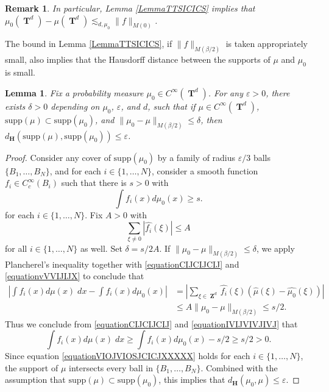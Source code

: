 \documentclass[dvipsnames,letterpaper,12pt]{article}
\numberwithin{equation}{section}
\DeclareMathOperator{\ZZ}{\mathbf{Z}}
\DeclareMathOperator{\TT}{\mathbf{T}}
\newtheorem{lemma}[theorem]{Lemma}
\newtheorem{remark}[theorem]{Remark}
\numberwithin{theorem}{section}
\begin{document}
\begin{remark} \label{remarkFOIJIOSJCIOSJ}
    In particular, Lemma \ref{LemmaTTSICICS} implies that $\mu_0(\TT^d) - \mu(\TT^d) \lesssim_{d,\mu_0} \| f \|_{M(0)}$.
\end{remark}

The bound in Lemma \ref{LemmaTTSICICS}, if $\| f \|_{M(\beta/2)}$ is taken appropriately small, also implies that the Hausdorff distance between the supports of $\mu$ and $\mu_0$ is small.

\begin{lemma} \label{LemmaTAOIAWOIDJ12301}
    Fix a probability measure $\mu_0 \in C^\infty(\TT^d)$. For any $\varepsilon > 0$, there exists $\delta > 0$ depending on $\mu_0$, $\varepsilon$, and $d$, such that if $\mu \in C^\infty(\TT^d)$, $\text{supp}(\mu) \subset \text{supp}(\mu_0)$, and $\| \mu_0 - \mu \|_{M(\beta/2)} \leq \delta$, then $d_\mathbf{H}(\text{supp}(\mu),\text{supp}(\mu_0)) \leq \varepsilon$.
\end{lemma}
\begin{proof}
    Consider any cover of $\text{supp}(\mu_0)$ by a family of radius $\varepsilon/3$ balls $\{ B_1,\dots,B_N \}$, and for each $i \in \{ 1, \dots, N \}$, consider a smooth function $f_i \in C_c^\infty(B_i)$ such that there is $s > 0$ with
    \begin{equation} \label{equationCIJCIJCIJ}
        \int f_i(x) d\mu_0(x) \geq s.
    \end{equation}
    for each $i \in \{ 1, \dots, N \}$. Fix $A > 0$ with
    \begin{equation} \label{equationvVVIJIJX}
        \sum_{\xi \neq 0} |\widehat{f_i}(\xi)| \leq A
    \end{equation}
    for all $i \in \{ 1, \dots, N \}$ as well. Set $\delta = s/2A$. If $\| \mu_0 - \mu \|_{M(\beta/2)} \leq \delta$, we apply Plancherel's inequality together with \eqref{equationCIJCIJCIJ} and \eqref{equationvVVIJIJX} to conclude that
    \begin{equation} \label{equationIVIJVIVJIVJ}
    \begin{split}
        \left| \int f_i(x) d\mu(x)\; dx - \int f_i(x) d\mu_0(x) \right| &= \left| \sum_{\xi \in \ZZ^d} \widehat{f_i}(\xi) \left( \widehat{\mu}(\xi) - \widehat{\mu_0}(\xi) \right) \right|\\
        &\leq A \| \mu_0 - \mu \|_{M(\beta/2)} \leq s/2.
    \end{split}
    \end{equation}
    Thus we conclude from \eqref{equationCIJCIJCIJ} and \eqref{equationIVIJVIVJIVJ} that
    \begin{equation} \label{equationVIOJVIOSJCICJXXXXX}
        \int f_i(x) d\mu(x)\; dx \geq \int f_i(x) d\mu_0(x) - s/2 \geq s/2 > 0.
    \end{equation}
    Since equation \eqref{equationVIOJVIOSJCICJXXXXX} holds for each $i \in \{ 1,\dots, N \}$, the support of $\mu$ intersects every ball in $\{ B_1, \dots, B_N \}$. Combined with the assumption that $\text{supp}(\mu) \subset \text{supp}(\mu_0)$, this implies that $d_\mathbf{H}(\mu_0,\mu) \leq \varepsilon$.
\end{proof}
\end{document}
